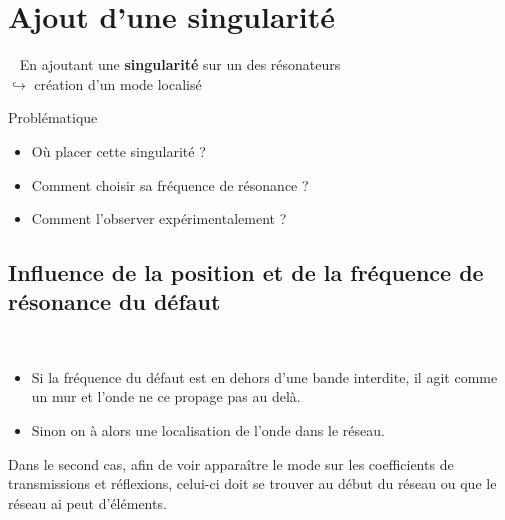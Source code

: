 \documentclass[12pt,notes=show]{beamer} %
\begin{document}
\section{Ajout d'une singularité}
\begin{frame}{~}
\insertsectionhead
	En ajoutant une \textbf{singularité} sur un des résonateurs\\
	  \hspace{1cm} $\hookrightarrow$ création d'un mode localisé \\

	\vspace{1cm}
	\begin{block}{Problématique}
		\begin{itemize}
			\item Où placer cette singularité ?
			\item Comment choisir sa fréquence de résonance ?
			\item Comment l'observer expérimentalement ?
		\end{itemize}
	\end{block}
 
\end{frame}

\subsection{Influence de la position et de la fréquence de résonance du défaut}
\begin{frame}{~}
\begin{itemize}
\item Si la fréquence du défaut est en dehors d'une bande interdite, il agit comme un mur et l'onde ne ce propage pas au delà. 
\item Sinon on à alors une localisation de l'onde dans le réseau.
\end{itemize}

Dans le second cas, afin de voir apparaître le mode sur les coefficients de transmissions et réflexions, celui-ci doit se trouver au début du réseau ou que le réseau ai peut d’éléments.
\end{frame}
\end{document}
